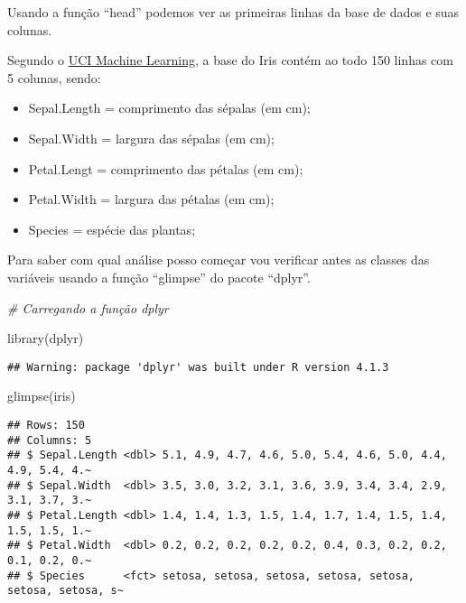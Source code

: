 \documentclass[
]{book}
\newenvironment{Shaded}{\begin{snugshade}}{\end{snugshade}}
\newcommand{\CommentTok}[1]{\textcolor[rgb]{0.56,0.35,0.01}{\textit{#1}}}
\newcommand{\FunctionTok}[1]{\textcolor[rgb]{0.00,0.00,0.00}{#1}}
\newcommand{\NormalTok}[1]{#1}
\providecommand{\tightlist}{%
  \setlength{\itemsep}{0pt}\setlength{\parskip}{0pt}}
\begin{document}
Usando a função ``head'' podemos ver as primeiras linhas da base de dados e suas colunas.

Segundo o \href{https://archive.ics.uci.edu/ml/datasets/iris}{UCI Machine Learning}, a base do Iris contém ao todo 150 linhas com 5 colunas, sendo:

\begin{itemize}
\tightlist
\item
  Sepal.Length = comprimento das sépalas (em cm);
\item
  Sepal.Width = largura das sépalas (em cm);
\item
  Petal.Lengt = comprimento das pétalas (em cm);
\item
  Petal.Width = largura das pétalas (em cm);
\item
  Species = espécie das plantas;
\end{itemize}

Para saber com qual análise posso começar vou verificar antes as classes das variáveis usando a função ``glimpse'' do pacote ``dplyr''.

\begin{Shaded}
\begin{Highlighting}[]
\CommentTok{\# Carregando a função dplyr}

\FunctionTok{library}\NormalTok{(dplyr)}
\end{Highlighting}
\end{Shaded}

\begin{verbatim}
## Warning: package 'dplyr' was built under R version 4.1.3
\end{verbatim}

\begin{Shaded}
\begin{Highlighting}[]
\FunctionTok{glimpse}\NormalTok{(iris)}
\end{Highlighting}
\end{Shaded}

\begin{verbatim}
## Rows: 150
## Columns: 5
## $ Sepal.Length <dbl> 5.1, 4.9, 4.7, 4.6, 5.0, 5.4, 4.6, 5.0, 4.4, 4.9, 5.4, 4.~
## $ Sepal.Width  <dbl> 3.5, 3.0, 3.2, 3.1, 3.6, 3.9, 3.4, 3.4, 2.9, 3.1, 3.7, 3.~
## $ Petal.Length <dbl> 1.4, 1.4, 1.3, 1.5, 1.4, 1.7, 1.4, 1.5, 1.4, 1.5, 1.5, 1.~
## $ Petal.Width  <dbl> 0.2, 0.2, 0.2, 0.2, 0.2, 0.4, 0.3, 0.2, 0.2, 0.1, 0.2, 0.~
## $ Species      <fct> setosa, setosa, setosa, setosa, setosa, setosa, setosa, s~
\end{verbatim}
\end{document}
